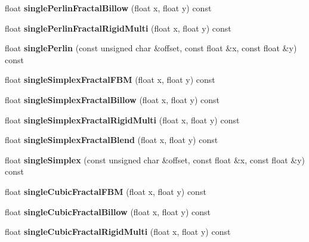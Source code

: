 \begin{DoxyCompactItemize}
float {\bfseries single\+Perlin\+Fractal\+Billow} (float x, float y) const
\item 
\mbox{\label{classnoisefast_a4ccec3d7e2f9def3bb30b88aea097d37}} 
float {\bfseries single\+Perlin\+Fractal\+Rigid\+Multi} (float x, float y) const
\item 
\mbox{\label{classnoisefast_a3d6d0125f36c8073bec97012191c54a1}} 
float {\bfseries single\+Perlin} (const unsigned char \&offset, const float \&x, const float \&y) const
\item 
\mbox{\label{classnoisefast_a81a061975415d9258c0185ab73462144}} 
float {\bfseries single\+Simplex\+Fractal\+F\+BM} (float x, float y) const
\item 
\mbox{\label{classnoisefast_a283ad511f07c5fa332e49de6820c4574}} 
float {\bfseries single\+Simplex\+Fractal\+Billow} (float x, float y) const
\item 
\mbox{\label{classnoisefast_a7784a68dd9bf276c543fa68b419571cb}} 
float {\bfseries single\+Simplex\+Fractal\+Rigid\+Multi} (float x, float y) const
\item 
\mbox{\label{classnoisefast_a6c1acc03b9283d02ac0c5e2d89063645}} 
float {\bfseries single\+Simplex\+Fractal\+Blend} (float x, float y) const
\item 
\mbox{\label{classnoisefast_a99d5b2354edd5f946c40d5fc1de26634}} 
float {\bfseries single\+Simplex} (const unsigned char \&offset, const float \&x, const float \&y) const
\item 
\mbox{\label{classnoisefast_ad53098a5dc63c73e31241d1ec622efdd}} 
float {\bfseries single\+Cubic\+Fractal\+F\+BM} (float x, float y) const
\item 
\mbox{\label{classnoisefast_a4aab185565f5bfc4dc94408151470e3f}} 
float {\bfseries single\+Cubic\+Fractal\+Billow} (float x, float y) const
\item 
\mbox{\label{classnoisefast_add88d18c0f24ab14b2dbdbf6cee32c15}} 
float {\bfseries single\+Cubic\+Fractal\+Rigid\+Multi} (float x, float y) const

\end{DoxyCompactItemize}
